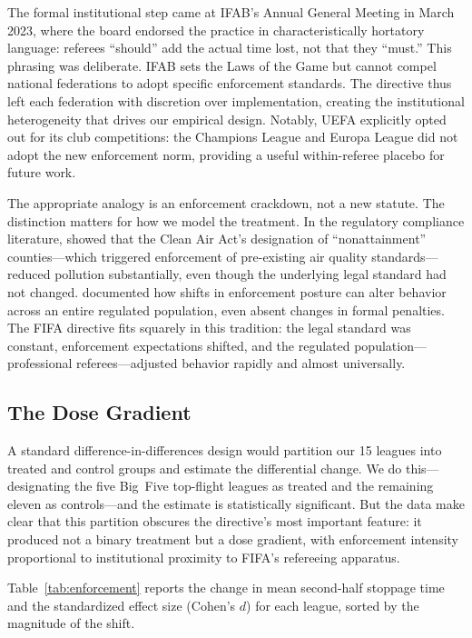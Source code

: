 The formal institutional step came at IFAB's Annual General Meeting in
March 2023, where the board endorsed the practice in characteristically
hortatory language: referees ``should'' add the actual time lost, not
that they ``must.'' This phrasing was deliberate. IFAB sets the Laws of
the Game but cannot compel national federations to adopt specific
enforcement standards. The directive thus left each federation with
discretion over implementation, creating the institutional heterogeneity
that drives our empirical design. Notably, UEFA explicitly opted out for
its club competitions: the Champions League and Europa League did not
adopt the new enforcement norm, providing a useful within-referee
placebo for future work.

The appropriate analogy is an enforcement crackdown, not a new statute.
The distinction matters for how we model the treatment. In the regulatory
compliance literature, \citet{greenstone2004did} showed that the Clean
Air Act's designation of ``nonattainment'' counties---which triggered
enforcement of pre-existing air quality standards---reduced pollution
substantially, even though the underlying legal standard had not changed.
\citet{johnson2020compliance} documented how shifts in enforcement
posture can alter behavior across an entire regulated population, even
absent changes in formal penalties. The FIFA directive fits squarely in
this tradition: the legal standard was constant, enforcement expectations
shifted, and the regulated population---professional referees---adjusted
behavior rapidly and almost universally.


\subsection{The Dose Gradient}
\label{sec:background:dose}

A standard difference-in-differences design would partition our 15
leagues into treated and control groups and estimate the differential
change. We do this---designating the five Big~Five top-flight leagues
as treated and the remaining eleven as controls---and the estimate is
statistically significant. But the data make clear that this partition
obscures the directive's most important feature: it produced not a
binary treatment but a dose gradient, with enforcement intensity
proportional to institutional proximity to FIFA's refereeing apparatus.

Table~\ref{tab:enforcement} reports the change in mean second-half
stoppage time and the standardized effect size (Cohen's $d$) for each
league, sorted by the magnitude of the shift.

